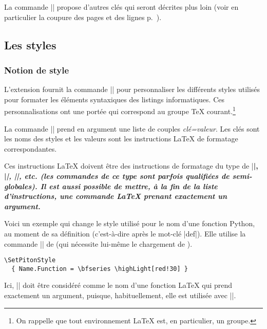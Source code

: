 \documentclass[dvipsnames,svgnames]{article}
\begin{document}
\bigskip
La commande |\PitonOptions| propose d'autres clés qui seront décrites plus loin (voir en
particulier la coupure des pages et des lignes p.~\pageref{breakable}).



\subsection{Les styles}

\label{styles}

\subsubsection{Notion de style}

L'extension  fournit la commande |\SetPitonStyle| pour personnaliser les
différents styles utilisés pour formater les éléments syntaxiques des listings
informatiques. Ces personnalisations ont une portée qui correspond au groupe TeX
courant.\footnote{On rappelle que tout environnement LaTeX est, en particulier, un
  groupe.}

\bigskip
{} La commande |\SetPitonStyle| prend en argument une liste de
couples \textsl{clé=valeur}. Les clés sont les noms des styles et les valeurs sont les
instructions LaTeX de formatage correspondantes.

\bigskip
Ces instructions LaTeX doivent être des instructions de formatage du type de |\bfseries|,
|\slshape|, |\color{...}|, etc. (les commandes de ce type sont parfois
qualifiées de \emph{semi-globales}). Il est aussi possible de mettre, \emph{à la fin de la liste
  d'instructions}, une commande LaTeX prenant exactement un argument.

\bigskip
Voici un exemple qui change le style utilisé pour le nom d'une fonction Python, au moment
de sa définition (c'est-à-dire après le mot-clé |def|). Elle utilise la commande
|\highLight| de  (qui nécessite lui-même le chargement de ).

\begin{Verbatim}
\SetPitonStyle
  { Name.Function = \bfseries \highLight[red!30] }
\end{Verbatim}

Ici, |\highLight[red!30]| doit être considéré comme le nom d'une fonction LaTeX qui prend
exactement un argument, puisque, habituellement, elle est utilisée avec
||.
\end{document}
